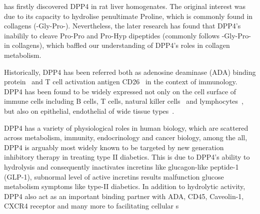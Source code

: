 \citet{Hopsu-Havu1966} has firstly discovered DPP4 in rat liver homogenates. The original interest was due to its capacity to hydrolise penultimate Proline, which is commonly found in collagens (-Gly-Pro-). Nevertheless, the later research has found that DPP4's inabilily to cleave Pro-Pro and Pro-Hyp dipeptides (commonly follows -Gly-Pro- in collagens), which baffled our understanding of DPP4's roles in collagen metabolism.
\par
Historically, DPP4 has been referred both as adenosine deaminase (ADA) binding protein~\cite{Kameoka_1993} and T cell activation antigen CD26~\cite{Fleischer_1994} in the context of immunology. DPP4 has been found to be widely expressed not only on the cell surface of immune cells including B cells, T cells, natural killer cells~\cite{Fleischer1987,Fleischer1988,Gorrell1991,Capuani2018,Bühling1994,Bühling1995} and lymphocytes~\cite{Gorvel1991}, but also on epithelial, endothelial of wide tissue types~\cite{Gorrell2001}. 
\par 
DPP4 has a variety of physiological roles in human biology, which are scattered across metabolism, immunity, endocrinology and cancer biology, among the all, DPP4 is arguably most widely known to be targeted by new generation inhibitory therapy in treating type II diabetics. This is due to DPP4's ability to hydrolysis and consequently inactivates incretins like glucagon-like peptide-1 (GLP-1), subnormal level of active incretins results malfunction glucose metabolism symptoms like type-II diabetics. In addition to hydrolytic activity, DPP4 also act as an important binding partner with ADA, CD45, Caveolin-1, CXCR4 receptor and many more to facilitating cellular s
\par 
